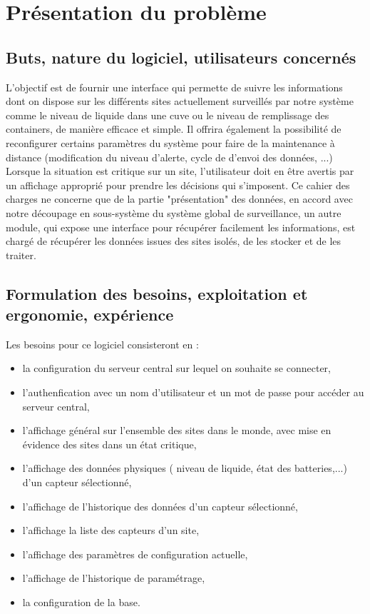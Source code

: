 \section{Présentation du problème}
\subsection{Buts, nature du logiciel, utilisateurs concernés}
L'objectif est de fournir une interface qui permette de suivre les informations dont on dispose sur les différents sites actuellement surveillés par notre système comme le niveau de liquide dans une cuve ou le niveau de remplissage des containers, de manière efficace et simple. Il offrira également la possibilité de reconfigurer certains paramètres du système pour faire de la maintenance à distance (modification du niveau d'alerte, cycle de d'envoi des données, ...)
Lorsque la situation est critique sur un site, l'utilisateur doit en être avertis par un affichage approprié pour prendre les décisions qui s'imposent.
Ce cahier des charges ne concerne que de la partie "présentation" des données, en accord avec notre découpage en sous-système du système global de surveillance, un autre module, qui expose une interface pour récupérer facilement les informations, est chargé de récupérer les données issues des sites isolés, de les stocker et de les traiter.

\subsection{Formulation des besoins, exploitation et ergonomie, expérience}
Les besoins pour ce logiciel consisteront en :
\begin{itemize}
	\item la configuration du serveur central sur lequel on souhaite se connecter,
	\item l'authenfication avec un nom d'utilisateur et un mot de passe pour accéder au serveur central,
	\item l'affichage général sur l'ensemble des sites dans le monde, avec mise en évidence des sites dans un état critique,
	\item l'affichage des données physiques ( niveau de liquide, état des batteries,...) d'un capteur sélectionné,
	\item l'affichage de l'historique des données d'un capteur sélectionné,
	\item l'affichage la liste des capteurs d'un site,
	\item l'affichage des paramètres de configuration actuelle,
	\item l'affichage de l'historique de paramétrage,
	\item la configuration de la base.
\end{itemize}

